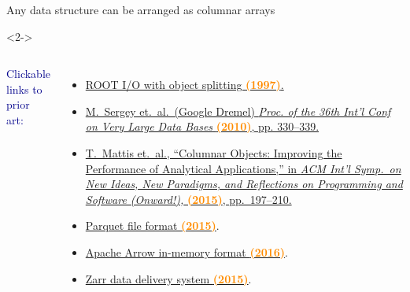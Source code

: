 \documentclass[aspectratio=169]{beamer}
\begin{document}
\begin{frame}{Any data structure can be arranged as columnar arrays}
\begin{center}
\end{center}

\vspace{-0.25 cm}
\begin{uncoverenv}<2->
\begin{columns}
\textcolor{darkblue}{Clickable links to prior art:}

\scriptsize
\begin{itemize}
\item \href{https://web.archive.org/web/19970225083621/http://root.cern.ch/root/HowtoWriteTree.html}{ROOT I/O with object splitting \textcolor{darkorange}{\bf (1997)}.}
\item \href{https://ai.google/research/pubs/pub36632}{M.\ Sergey et.\ al.\ (Google Dremel) {\it Proc. of the 36th Int'l Conf on Very Large Data Bases} \textcolor{darkorange}{\bf (2010)}, pp. 330--339.}
\item \href{https://dl.acm.org/citation.cfm?id=2814228.2814230}{T.\ Mattis et.\ al., ``Columnar Objects: Improving the Performance of Analytical Applications,'' in {\it ACM Int'l Symp.\ on New Ideas, New Paradigms, and Reflections on Programming and Software (Onward!),} \textcolor{darkorange}{\bf (2015)}, pp.\ 197--210.}
\item \href{https://parquet.apache.org}{Parquet file format \textcolor{darkorange}{\bf (2015)}}.
\item \href{https://arrow.apache.org}{Apache Arrow in-memory format \textcolor{darkorange}{\bf (2016)}}.
\item \href{https://zarr.readthedocs.io/en/stable/tutorial.html\#ragged-arrays}{Zarr data delivery system \textcolor{darkorange}{\bf (2015)}}.
\end{itemize}


\end{columns}
\end{uncoverenv}
\end{frame}
\end{document}

